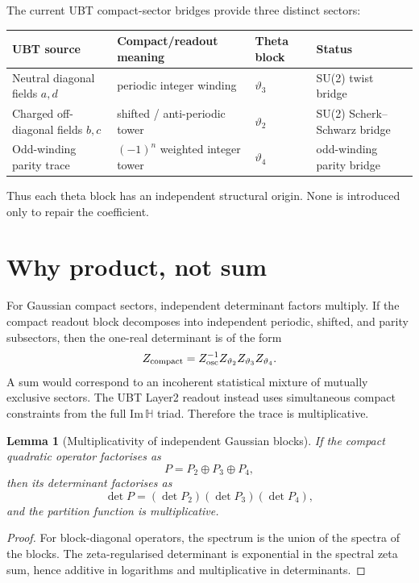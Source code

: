 \documentclass[12pt,a4paper]{article}
\newtheorem{lemma}[definition]{Lemma}
\begin{document}
The current UBT compact-sector bridges provide three distinct sectors:

\begin{longtable}{llll}
\toprule
UBT source & Compact/readout meaning & Theta block & Status \\
\midrule
\endhead
Neutral diagonal fields $a,d$ & periodic integer winding & $\vartheta_3$ & SU(2) twist bridge \\
Charged off-diagonal fields $b,c$ & shifted / anti-periodic tower & $\vartheta_2$ & SU(2) Scherk--Schwarz bridge \\
Odd-winding parity trace & $(-1)^n$ weighted integer tower & $\vartheta_4$ & odd-winding parity bridge \\
\bottomrule
\end{longtable}

Thus each theta block has an independent structural origin.  None is introduced
only to repair the coefficient.

\section{Why product, not sum}

For Gaussian compact sectors, independent determinant factors multiply.  If the
compact readout block decomposes into independent periodic, shifted, and parity
subsectors, then the one-real determinant is of the form
\[
  Z_{\rm compact}=Z_{\rm osc}^{-1}Z_{\vartheta_2}Z_{\vartheta_3}Z_{\vartheta_4}.
\]
A sum would correspond to an incoherent statistical mixture of mutually
exclusive sectors.  The UBT Layer2 readout instead uses simultaneous compact
constraints from the full $\mathrm{Im}\,\mathbb H$ triad.  Therefore the trace is
multiplicative.

\begin{lemma}[Multiplicativity of independent Gaussian blocks]
If the compact quadratic operator factorises as
\[
  P=P_2\oplus P_3\oplus P_4,
\]
then its determinant factorises as
\[
  \det P=(\det P_2)(\det P_3)(\det P_4),
\]
and the partition function is multiplicative.
\end{lemma}

\begin{proof}
For block-diagonal operators, the spectrum is the union of the spectra of the
blocks.  The zeta-regularised determinant is exponential in the spectral zeta
sum, hence additive in logarithms and multiplicative in determinants.
\end{proof}
\end{document}
